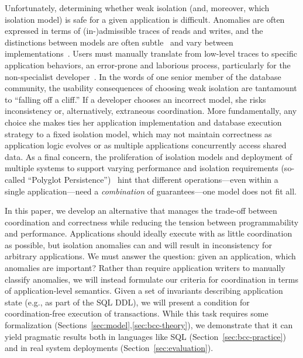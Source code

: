 Unfortunately, determining whether weak isolation (and, moreover,
which isolation model) is safe for a given application is
difficult. Anomalies are often expressed in terms of (in-)admissible
traces of reads and writes, and the distinctions between models are
often subtle~\cite{adya-isolation,isolation-semantics} and vary
between implementations~\cite{hat-vldb}. Users must manually translate
from low-level traces to specific application behaviors, an
error-prone and laborious process, particularly for the non-specialist
developer~\cite{consistency-borders}. In the words of one senior
member of the database community, the usability consequences of
choosing weak isolation are tantamount to ``falling off a cliff.'' If a
developer chooses an incorrect model, she risks inconsistency or,
alternatively, extraneous coordination. More fundamentally, any choice
she makes ties her application implementation and database execution
strategy to a fixed isolation model, which may not maintain
correctness as application logic evolves or as multiple applications
concurrently access shared data. As a final concern, the proliferation
of isolation models and deployment of multiple systems to support
varying performance and isolation requirements (so-called ``Polyglot
Persistence'')~\cite{polyglot} hint that different operations---even
within a single application---need a \textit{combination} of
guarantees---one model does not fit all.



 In this paper, we develop
an alternative that manages the trade-off between coordination and
correctness while reducing the tension between programmability and
performance. Applications should ideally execute with as little
coordination as possible, but isolation anomalies can and will result
in inconsistency for arbitrary applications. We must answer the
question: given an application, which anomalies are important? Rather
than require application writers to manually classify anomalies, we
will instead formulate our criteria for coordination in terms of
application-level semantics. Given a set of invariants describing
application state (e.g., as part of the SQL DDL), we will present a
condition for coordination-free execution of transactions. While this
task requires some formalization
(Sections~\ref{sec:model},\ref{sec:bcc-theory}), we demonstrate that
it can yield pragmatic results both in languages like SQL
(Section~\ref{sec:bcc-practice}) and in real system deployments
(Section~\ref{sec:evaluation}).



